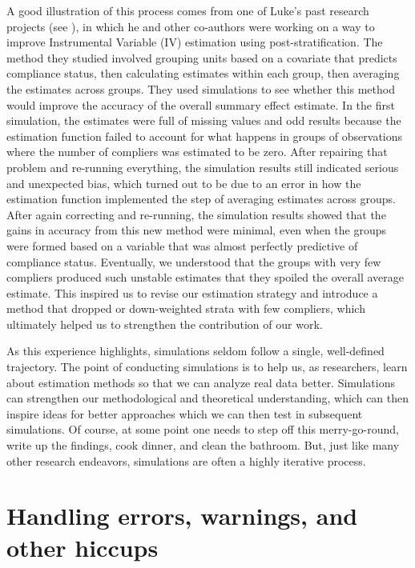 \documentclass[
]{book}
\begin{document}
A good illustration of this process comes from one of Luke's past research projects (see \citet{pashley2024improving}), in which he and other co-authors were working on a way to improve Instrumental Variable (IV) estimation using post-stratification.
The method they studied involved grouping units based on a covariate that predicts compliance status, then calculating estimates within each group, then averaging the estimates across groups.
They used simulations to see whether this method would improve the accuracy of the overall summary effect estimate.
In the first simulation, the estimates were full of missing values and odd results because the estimation function failed to account for what happens in groups of observations where the number of compliers was estimated to be zero.
After repairing that problem and re-running everything, the simulation results still indicated serious and unexpected bias, which turned out to be due to an error in how the estimation function implemented the step of averaging estimates across groups.
After again correcting and re-running, the simulation results showed that the gains in accuracy from this new method were minimal, even when the groups were formed based on a variable that was almost perfectly predictive of compliance status.
Eventually, we understood that the groups with very few compliers produced such unstable estimates that they spoiled the overall average estimate.
This inspired us to revise our estimation strategy and introduce a method that dropped or down-weighted strata with few compliers, which ultimately helped us to strengthen the contribution of our work.

As this experience highlights, simulations seldom follow a single, well-defined trajectory.
The point of conducting simulations is to help us, as researchers, learn about estimation methods so that we can analyze real data better.
Simulations can strengthen our methodological and theoretical understanding, which can then inspire ideas for better approaches which we can then test in subsequent simulations.
Of course, at some point one needs to step off this merry-go-round, write up the findings, cook dinner, and clean the bathroom.
But, just like many other research endeavors, simulations are often a highly iterative process.

\section{Handling errors, warnings, and other hiccups}\label{error-handling}
\end{document}
